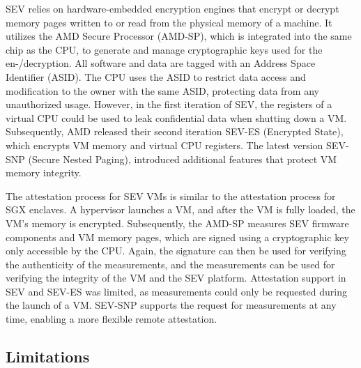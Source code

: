 \begin{description}
    SEV relies on hardware-embedded encryption engines that encrypt or decrypt
    memory pages written to or read from the physical memory of a machine. It
    utilizes the AMD Secure Processor (AMD-SP), which is integrated into the
    same chip as the CPU, to generate and manage cryptographic keys used for the
    en-/decryption. All software and data are tagged with an Address Space
    Identifier (ASID). The CPU uses the ASID to restrict data access and
    modification to the owner with the same ASID, protecting data from any
    unauthorized usage. However, in the first iteration of SEV, the registers of
    a virtual CPU could be used to leak confidential data when shutting down a
    VM. Subsequently, AMD released their second iteration SEV-ES (Encrypted
    State), which encrypts VM memory and virtual CPU registers. The latest
    version SEV-SNP (Secure Nested Paging), introduced additional features that
    protect VM memory integrity.

    The attestation process for SEV VMs is similar to the attestation process
    for SGX enclaves. A hypervisor launches a VM, and after the VM is fully
    loaded, the VM's memory is encrypted. Subsequently, the AMD-SP measures SEV
    firmware components and VM memory pages, which are signed using a
    cryptographic key only accessible by the CPU. Again, the signature can then
    be used for verifying the authenticity of the measurements, and the
    measurements can be used for verifying the integrity of the VM and the SEV
    platform. Attestation support in SEV and SEV-ES was limited, as measurements
    could only be requested during the launch of a VM. SEV-SNP supports the
    request for measurements at any time, enabling a more flexible remote
    attestation.
\end{description}

\subsection{Limitations}
\label{sec:limitations}

